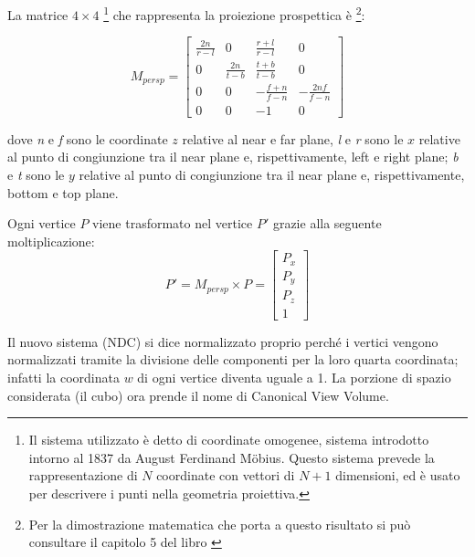 La matrice $4\times 4$ \footnote{Il sistema utilizzato è detto di coordinate omogenee, sistema introdotto intorno al 1837 da August Ferdinand Möbius\cite{homog}. Questo sistema prevede la rappresentazione di $N$ coordinate con vettori di $N+1$ dimensioni, ed è usato per descrivere i punti nella geometria proiettiva.} che rappresenta la proiezione prospettica è \footnote{Per la dimostrazione matematica che porta a questo risultato si può consultare il capitolo 5 del libro \cite{libro}}:

$$M_{persp}=
\begin{bmatrix}
\frac{2n}{r-l} & 0 & \frac{r+l}{r-l} & 0 \\
0 & \frac{2n}{t-b} & \frac{t+b}{t-b} & 0 \\
0 & 0 & -\frac{f+n}{f-n} & -\frac{2nf}{f-n} \\
0 & 0 & -1 & 0
\end{bmatrix}
$$

dove \textit{n} e \textit{f} sono le coordinate $z$ relative al near e far plane, \textit{l} e \textit{r} sono le $x$ relative al punto di congiunzione tra il near plane e, rispettivamente, left e right plane; \textit{b} e \textit{t} sono le $y$ relative al punto di congiunzione tra il near plane e, rispettivamente, bottom e top plane.

Ogni vertice $P$ viene trasformato nel vertice $P'$ grazie alla seguente moltiplicazione:
$$P'=M_{persp}\times P=
\begin{bmatrix}
P_x \\ P_y \\ P_z \\ 1
\end{bmatrix}$$

Il nuovo sistema (NDC) si dice normalizzato proprio perché i vertici vengono normalizzati tramite la divisione delle componenti per la loro quarta coordinata; infatti la coordinata $w$ di ogni vertice diventa uguale a 1. La porzione di spazio considerata (il cubo) ora prende il nome di Canonical View Volume.

